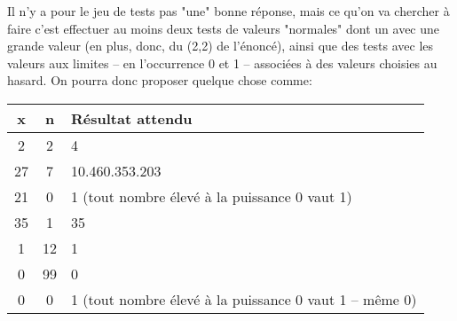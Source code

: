 \documentclass[12pt]{article}
\begin{document}
	\begin{MaReponse}
		Il n'y a pour le jeu de tests pas "une" bonne réponse, mais ce qu'on va chercher à faire c'est effectuer au moins deux tests de valeurs "normales" dont un avec une grande valeur (en plus, donc, du (2,2) de l'énoncé), ainsi que des tests avec les valeurs aux limites -- en l'occurrence 0 et 1 -- associées à des valeurs choisies au hasard. On pourra donc proposer quelque chose comme:
		
		\centering
		\begin{tabular}{|c|c|m{4cm}|}
			\hline
			\textbf{x} & \textbf{n} & \textbf{Résultat attendu}\\
			\hline
			2 & 2 & 4\\
			\hline
			27 & 7 & 10.460.353.203\\
			\hline
			21 & 0 & 1 (tout nombre élevé à la puissance 0 vaut 1)\\
			\hline
			35 & 1 & 35 \\
			\hline
			1 & 12 & 1 \\
			\hline
			0 & 99 & 0\\
			\hline
			0 & 0 & 1 (tout nombre élevé à la puissance 0 vaut 1 -- même 0)\\
			\hline
		\end{tabular}
	\end{MaReponse}
\end{document}
